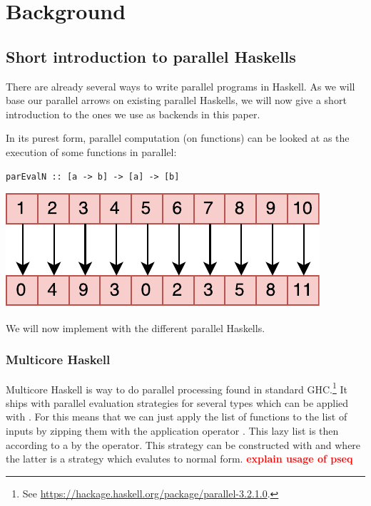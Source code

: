\section{Background}
\label{sec:background}
\subsection{Short introduction to parallel Haskells}
There are already several ways to write parallel programs in Haskell. As we will base our parallel arrows on existing parallel Haskells, we will now give a short introduction to the ones we use as backends in this paper.

In its purest form, parallel computation (on functions) can be looked at as the execution of some functions  in parallel:

\begin{lstlisting}[frame=htrbl]
parEvalN :: [a -> b] -> [a] -> [b]
\end{lstlisting}
\begin{center}
	\includegraphics[scale=0.7]{images/parEvalN}
\end{center}
We will now implement  with the different parallel Haskells.

\subsubsection{Multicore Haskell}
Multicore Haskell \cite{Marlow2009} is way to do parallel processing found in standard GHC.\footnote{See \url{https://hackage.haskell.org/package/parallel-3.2.1.0}.} It ships with parallel evaluation strategies for several types which can be applied with . For  this means that we can just apply the list of functions \code{[a -> b]} to the list of inputs \code{[a]} by zipping them with the application operator \code{\$}. This lazy list \code{[b]} is then according to a  by the  operator. This strategy can be constructed with  and  where the latter is a strategy which evalutes to normal form.
\textbf{\textcolor{red}{explain usage of pseq}}

